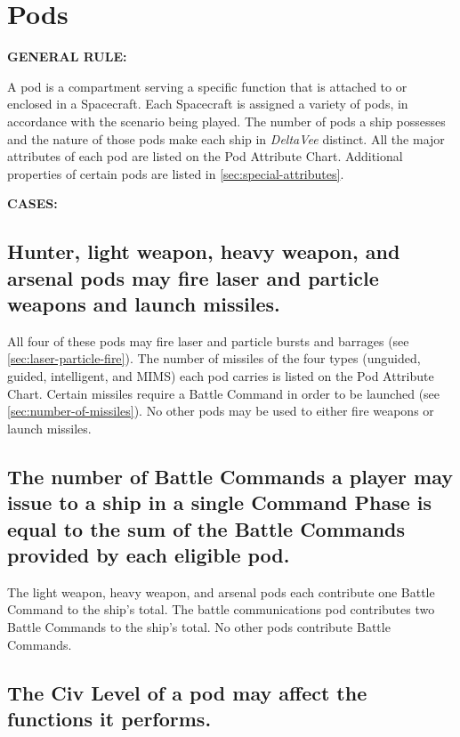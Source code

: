 \section{Pods}
\label{sec:pods-dv}

\noindent\textbf{GENERAL RULE:}

A pod is a compartment serving a specific function that is attached to
or enclosed in a Spacecraft. Each Spacecraft is assigned a variety of
pods, in accordance with the scenario being played. The number of pods
a ship possesses and the nature of those pods make each ship in
\emph{DeltaVee} distinct. All the major attributes of each pod are
listed on the Pod Attribute Chart. Additional properties of certain
pods are listed in \ref{sec:special-attributes}.

\medskip

\noindent\textbf{CASES:}

\subsection[Weapon Pods]{Hunter, light weapon, heavy weapon, and
  arsenal pods may fire laser and particle weapons and launch  
missiles.}
\label{sec:weapon-pods}



All four of these pods may fire laser and particle bursts and barrages
(see \ref{sec:laser-particle-fire}). The number of missiles of the
four types (unguided, guided, intelligent, and MIMS) each pod carries
is listed on the Pod Attribute Chart. Certain missiles require a
Battle Command in order to be launched (see
\ref{sec:number-of-missiles}). No other pods may be used to either
fire weapons or launch missiles.


\subsection[Battle Commands]{The number of Battle Commands a player
  may issue to a ship in a single Command Phase is equal to the  
  sum of the Battle Commands provided by each eligible pod.}
\label{sec:number-battle-commands}



The light weapon, heavy weapon, and arsenal pods each contribute one
Battle Command to the ship's total. The battle communications pod
contributes two Battle Commands to the ship's total. No other pods
contribute Battle Commands.


\subsection[Civ Level]{The Civ Level of a pod may affect the functions
  it 
  performs.}
\label{sec:civ-level-pod}



